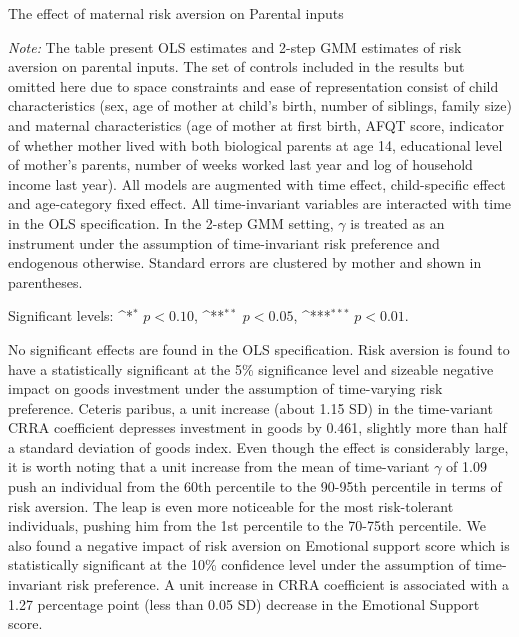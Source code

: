 \documentclass[]{article}
\begin{document}
\begin{table}[!t]
	\centering
	\begin{threeparttable}
		\def\sym#1{\ifmmode^{#1}\else\(^{#1}\)\fi}
		\caption{The effect of maternal risk aversion on Parental inputs}	
		\setlength{\extrarowheight}{0.3em}
		
		\label{table:main-result}
		\begin{tablenotes}[flushleft] \footnotesize
			\item \textit{Note:} The table present OLS estimates and 2-step GMM estimates of risk aversion on parental inputs. The set of controls included in the results but omitted here due to space constraints and ease of representation consist of child characteristics (sex, age of mother at child's birth, number of siblings, family size) and maternal characteristics (age of mother at first birth, AFQT score, indicator of whether mother lived with both biological parents at age 14, educational level of mother's parents, number of weeks worked last year and log of household income last year). All models are augmented with time effect, child-specific effect and age-category fixed effect. All time-invariant variables are interacted with time in the OLS specification. In the 2-step GMM setting, $\gamma$ is treated as an instrument under the assumption of time-invariant risk preference and endogenous otherwise. Standard errors are clustered by mother and shown in parentheses. 
			\item Significant levels: \sym{*} \(p<0.10\), \sym{**} \(p<0.05\), \sym{***} \(p<0.01\).
		\end{tablenotes}
	\end{threeparttable}
\end{table}

No significant effects are found in the OLS specification. Risk aversion is found to have a statistically significant at the 5\% significance level and sizeable negative impact on goods investment under the assumption of time-varying risk preference. Ceteris paribus, a unit increase (about 1.15 SD) in the time-variant CRRA coefficient depresses investment in goods by 0.461, slightly more than half a standard deviation of goods index. Even though the effect is considerably large, it is worth noting that a unit increase from the mean of time-variant $\gamma$ of 1.09 push an individual from the 60th percentile to the 90-95th percentile in terms of risk aversion. The leap is even more noticeable for the most risk-tolerant individuals, pushing him from the 1st percentile to the 70-75th percentile. We also found a negative impact of risk aversion on Emotional support score which is statistically significant at the 10\% confidence level under the assumption of time-invariant risk preference. A unit increase in CRRA coefficient is associated with a 1.27 percentage point (less than 0.05 SD) decrease in the Emotional Support score. 
\end{document}
